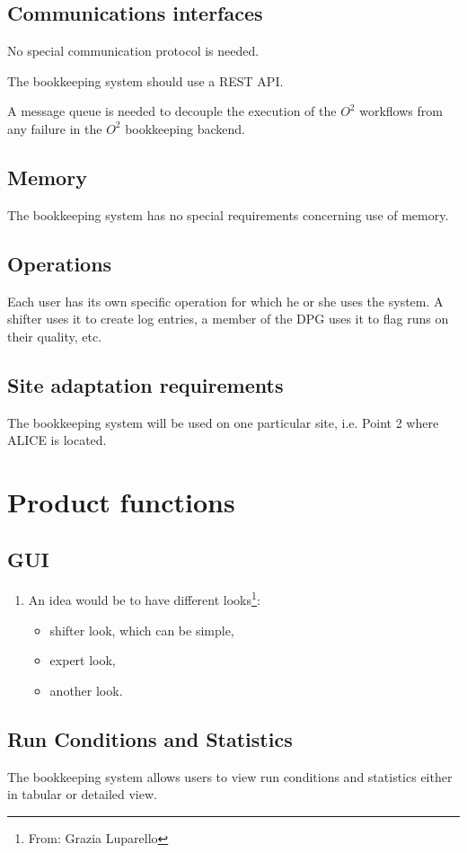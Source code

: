 \subsection{Communications interfaces}
No special communication protocol is needed.

The bookkeeping system should use a REST API. 

A message queue is needed to decouple the execution of the $O^2$ workflows from any failure in the $O^2$ bookkeeping backend.

\subsection{Memory}
The bookkeeping system has no special requirements concerning use of memory.

\subsection{Operations}
Each user has its own specific operation for which he or she uses the system. A shifter uses it to create log entries, a member of the DPG uses it to flag runs on their quality, etc.

\subsection{Site adaptation requirements}
The bookkeeping system will be used on one particular site, i.e. Point 2 where ALICE is located.

\section{Product functions}
\subsection{GUI}
\begin{enumerate}
  \item An idea would be to have different looks\footnote{From: Grazia Luparello}:
  \begin{itemize}
    \item shifter look, which can be simple,
    \item expert look,
    \item another look.
  \end{itemize}
\end{enumerate}
\subsection{Run Conditions and Statistics}
The bookkeeping system allows users to view run conditions and statistics either in tabular or detailed view.

